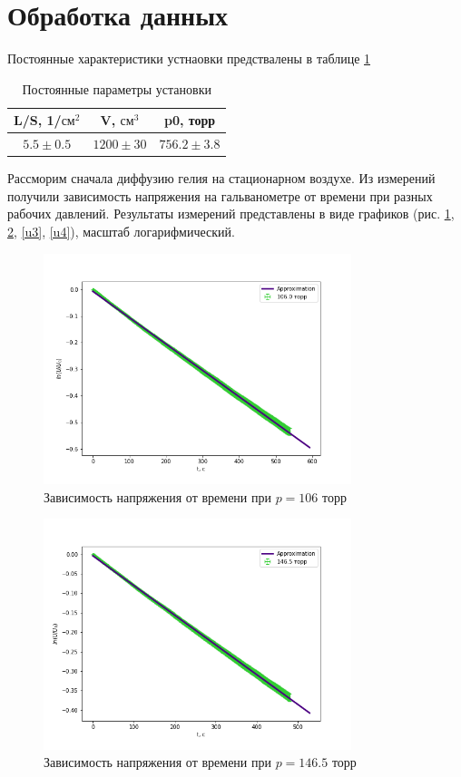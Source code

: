 \documentclass[a4paper,12pt]{article} %
\begin{document}
\section{Обработка данных}
Постоянные характеристики устнаовки предствалены в таблице \ref{const}
\begin{table} \label{const} \caption{Постоянные параметры установки}
\begin{tabular}{|c|c|c|}
\hline 
L/S, 1/$\text{см}^2$ & V, $\text{см}^3$ & p0, торр \\ 
\hline 
$ 5.5 \pm 0.5$ & $1200 \pm 30$ & $756.2 \pm 3.8$ \\ 
\hline 
\end{tabular} 
\end{table}
Рассморим сначала диффузию гелия на стационарном воздухе.
Из измерений получили зависимость напряжения на гальванометре от времени при разных рабочих давлений. Результаты измерений представлены в виде графиков (рис. \ref{u1}, \ref{u2}, \ref{u3}, \ref{u4}), масштаб логарифмический.

\begin{figure}[h!]
\begin{center}
\includegraphics[width=0.8\textwidth]{U(t)+10}
\end{center}
\caption{Зависимость напряжения от времени при $p=106$ торр} \label{u1}
\end{figure}

\begin{figure}[h!]
\begin{center}
\includegraphics[width=0.8\textwidth]{U(t)+14}
\end{center}
\caption{Зависимость напряжения от времени при $p=146.5$ торр} \label{u2}
\end{figure}
\end{document}
